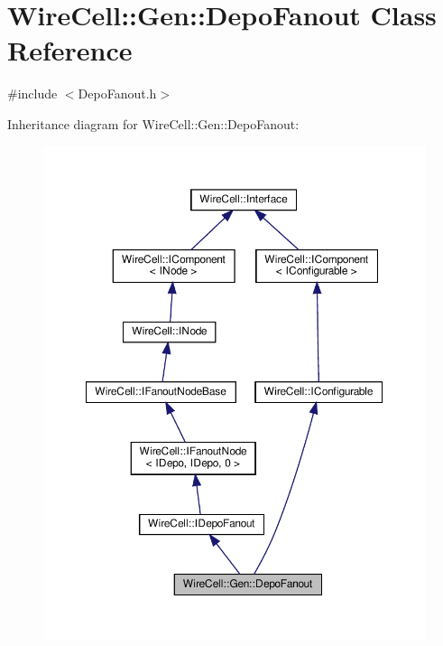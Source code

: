\hypertarget{class_wire_cell_1_1_gen_1_1_depo_fanout}{}\section{Wire\+Cell\+:\+:Gen\+:\+:Depo\+Fanout Class Reference}
\label{class_wire_cell_1_1_gen_1_1_depo_fanout}


{\ttfamily \#include $<$Depo\+Fanout.\+h$>$}



Inheritance diagram for Wire\+Cell\+:\+:Gen\+:\+:Depo\+Fanout\+:
\nopagebreak
\begin{figure}[H]
\begin{center}
\leavevmode
\includegraphics[width=350pt]{class_wire_cell_1_1_gen_1_1_depo_fanout__inherit__graph}
\end{center}
\end{figure}


